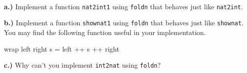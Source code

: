 \documentclass[11pt]{article}
\begin{document}
\begin{problem}\ \vspace{.125em} \\
\begin{description}
\item{{\bf{a.)}}} Implement a function {\tt{nat2int1}} using {\tt{foldn}} that behaves just like {\tt{nat2int}}.

\item{{\bf{b.)}}} Implement a function {\tt{shownat1}} using {\tt{foldn}} that behaves
just like {\tt{shownat}}.  You may find the following function useful in your
implementation.
\begin{program*}
\> wrap left right s = left ++ s ++ right
\end{program*}
\item{{\bf{c.)}}} Why can't you implement {\tt{int2nat}} using {\tt{foldn}}?
\end{description}
\end{problem}
\end{document}
